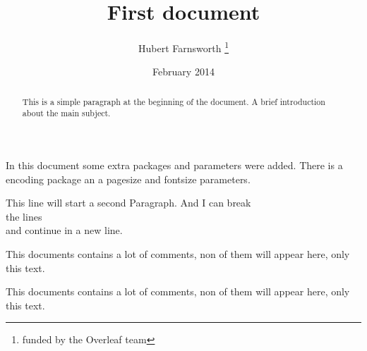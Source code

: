 \documentclass[12pt, letterpaper, twoside]{article}
\title{First document}
\author{Hubert Farnsworth \thanks{funded by the Overleaf team}}
\date{February 2014}
\begin{document}
\begin{titlepage}
\maketitle
\end{titlepage}

\begin{abstract}
This is a simple paragraph at the beginning of the 
document. A brief introduction about the main subject.
\end{abstract}

In this document some extra packages and parameters
were added. There is a encoding package
an a pagesize and fontsize parameters.

This line will start a second Paragraph. And I can break\\ the lines \\
and continue in a new line.

This documents contains a lot of comments, non of them
will appear here, only this text.

This documents contains a lot of comments, non of them
will appear here, only this text.

\begin{comment}
This text won't show up in the compiled pdf
this is just a multi-line comment. Useful
to, for instance, comment out slow-rendering
while working on the draft.
\end{comment}
\end{document}
